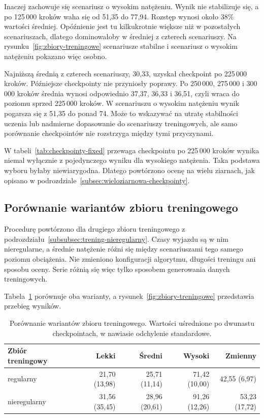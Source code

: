 Inaczej zachowuje się scenariusz o wysokim natężeniu. Wynik nie stabilizuje się, a po 125\,000 kroków waha się od 51,35 do 77,94. Rozstęp wynosi około 38\% wartości średniej. Opóźnienie jest tu kilkukrotnie większe niż w pozostałych scenariuszach, dlatego dominowałoby w średniej z czterech scenariuszy. Na rysunku~\ref{fig:zbiory-treningowe} scenariusze stabilne i scenariusz o wysokim natężeniu pokazano więc osobno.

Najniższą średnią z czterech scenariuszy, 30,33, uzyskał checkpoint po 225\,000 kroków. Późniejsze checkpointy nie przyniosły poprawy. Po 250\,000, 275\,000 i 300\,000 kroków średnia wynosi odpowiednio 37,37, 36,33 i 36,51, czyli wraca do poziomu sprzed 225\,000 kroków. W scenariuszu o wysokim natężeniu wynik pogarsza się z 51,35 do ponad 74. Może to wskazywać na utratę stabilności uczenia lub nadmierne dopasowanie do scenariuszy treningowych, ale samo porównanie checkpointów nie rozstrzyga między tymi przyczynami.

W tabeli~\ref{tab:checkpointy-fixed} przewaga checkpointu po 225\,000 kroków wynika niemal wyłącznie z pojedynczego wyniku dla wysokiego natężenia. Taka podstawa wyboru byłaby niewiarygodna. Dlatego powtórzono ocenę na wielu ziarnach, jak opisano w podrozdziale~\ref{subsec:wieloziarnowa-checkpointy}.

\subsection{Porównanie wariantów zbioru treningowego}
\label{subsec:porownanie-zbiorow}

Procedurę powtórzono dla drugiego zbioru treningowego z podrozdziału~\ref{subsubsec:trening-nieregularny}. Czasy wyjazdu są w nim nieregularne, a średnie natężenie różni się między scenariuszami tego samego poziomu obciążenia. Nie zmieniono konfiguracji algorytmu, długości treningu ani sposobu oceny. Serie różnią się więc tylko sposobem generowania danych treningowych.

Tabela~\ref{tab:zbiory-treningowe} porównuje oba warianty, a rysunek~\ref{fig:zbiory-treningowe} przedstawia przebieg wyników.

\begin{table}[!htbp] \centering
    \caption[Porównanie wariantów zbioru treningowego.]{Porównanie wariantów zbioru treningowego. Wartości uśrednione po dwunastu checkpointach, w nawiasie odchylenie standardowe.}
    \label{tab:zbiory-treningowe}
    \small
    \begin{tabular}{| l | r | r | r | r |} \hline
        Zbiór treningowy & Lekki & Średni & Wysoki & Zmienny \\ \hline\hline
        regularny    & 21,70 (13,98) & 25,71 (11,14) & 71,42 (10,00) & 42,55 (6,97) \\ \hline
        nieregularny & 31,56 (35,45) & 28,96 (20,61) & 91,26 (12,26) & 53,23 (17,72) \\ \hline
    \end{tabular}
\end{table}

